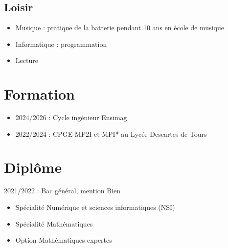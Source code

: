 \documentclass[11pt,oneside,a4paper,titlepage]{article}
\begin{document}
\begin{tcolorbox}
\begin{minipage}[t]{8cm}
\begin{tcolorbox}[grow to left by=0.6cm,colback=gray!25,colframe=white]
      \section*{Loisir}
      \begin{itemize}
        \item{Musique : pratique de la batterie pendant 10 ans en école de musique}
        \item{Informatique : programmation}
        \item{Lecture}
      \end{itemize}
    \end{tcolorbox}
  \end{minipage}
  \begin{minipage}[t]{10.6cm}
    \vspace*{-0.5cm}
    \begin{tcolorbox}[grow to right by=0.75cm,colframe=white,colback=white]
      \section*{Formation}
      \begin{itemize}
        \item{2024/2026 : Cycle ingénieur Ensimag}
        \item{2022/2024 : CPGE MP2I et MPI* au Lycée Descartes de Tours}
      \end{itemize}

      \section*{Diplôme}
      2021/2022 : Bac général, mention Bien
      \begin{itemize}
        \item{Spécialité Numérique et sciences informatiques (NSI)}
        \item{Spécialité Mathématiques}
        \item{Option Mathématiques expertes}
      \end{itemize}


\end{tcolorbox}
\end{minipage}
\end{tcolorbox}
\end{document}

